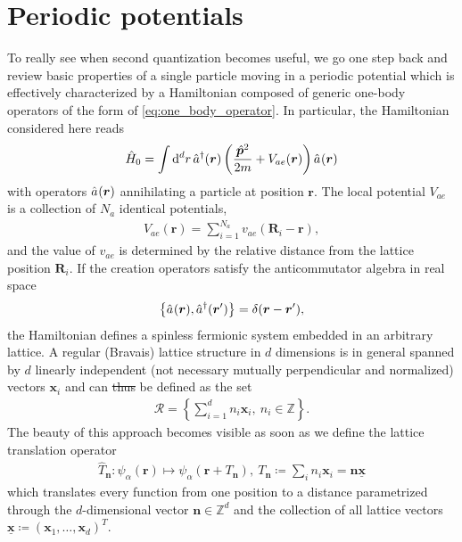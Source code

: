 \documentclass{svmono}
\def\rd{\mathrm d}
\def\pdag{{\vphantom\dag}}
\newcommand{\anticommutator}[1]{\left\{ #1 \right\}}
\newcommand{\brlr}[1]{\left( #1 \right)}
\providecommand{\DIFdeltex}[1]{{\protect\color{red}\sout{#1}}}                      %
\providecommand{\DIFdelbegin}{} %
\providecommand{\DIFdelend}{} %
\providecommand{\DIFdel}[1]{\texorpdfstring{\DIFdeltex{#1}}{}} %
\newcommand{\DIFscaledelfig}{0.5}
\newlength{\DIFdelgraphicswidth} %
\newlength{\DIFdelgraphicsheight} %
\newcommand{\DIFdelincludegraphics}[2][]{%
\sbox{\DIFdelgraphicsbox}{\DIFOincludegraphics[#1]{#2}}%
\settoboxwidth{\DIFdelgraphicswidth}{\DIFdelgraphicsbox} %
\settoboxtotalheight{\DIFdelgraphicsheight}{\DIFdelgraphicsbox} %
\scalebox{\DIFscaledelfig}{%
\parbox[b]{\DIFdelgraphicswidth}{\usebox{\DIFdelgraphicsbox}\\[-\baselineskip] \rule{\DIFdelgraphicswidth}{0em}}\llap{\resizebox{\DIFdelgraphicswidth}{\DIFdelgraphicsheight}{%
\setlength{\unitlength}{\DIFdelgraphicswidth}%
\begin{picture}(1,1)%
\thicklines\linethickness{2pt} %
{\color[rgb]{1,0,0}\put(0,0){\framebox(1,1){}}}%
{\color[rgb]{1,0,0}\put(0,0){\line( 1,1){1}}}%
{\color[rgb]{1,0,0}\put(0,1){\line(1,-1){1}}}%
\end{picture}%
}\hspace*{3pt}}} %
} %
\DeclareRobustCommand{\DIFdelbegin}{\DIFOdelbegin \let\includegraphics\DIFdelincludegraphics} %
\DeclareRobustCommand{\DIFdelend}{\DIFOaddend \let\includegraphics\DIFOincludegraphics} %
\begin{document}
\section{Periodic potentials}
\label{sec:periodic_potentials}
To really see when second quantization becomes useful, we go one step back and review basic properties of a single particle moving in a periodic potential which is effectively characterized by a Hamiltonian composed of generic one-body operators of the form of \cref{eq:one_body_operator}.
In particular, the Hamiltonian considered here reads
\begin{align}
    \hat H_0 = \int\rd^d r\, \hat a^\dag({\bm r})\brlr{\frac{\hat{\bm p}^2}{2m}+V_{ae}({\bm r})}\hat a^\pdag({\bm r})
\end{align}
with operators $\hat a^\pdag({\bm r})$ annihilating a particle at position $\bm r$.
The local potential $V_{ae}$ is a collection of $N_a$ identical potentials,
\begin{align}
    V_{ae}({\bm r}) = \sum_{i=1}^{N_a}v_{ae}({\bm R}_i - {\bm r}),
\end{align}
and the value of $v_{ae}$ is determined by the relative distance from the lattice position ${\bm R}_i$.
If the creation operators satisfy the anticommutator algebra in real space
\begin{align}
    \anticommutator{\hat a^\pdag({\bm r}),\hat a^\dag({\bm r'})}=\delta({\bm r}-{\bm r'}),
\end{align}
the Hamiltonian defines a spinless fermionic system embedded in an arbitrary lattice.
A regular (Bravais) lattice structure in $d$ dimensions is in general spanned by $d$ linearly independent (not necessary mutually perpendicular and normalized) vectors ${\bm x}_i$ and can \DIFdelbegin \DIFdel{thus }\DIFdelend be defined as the set
\begin{align}
    \mathcal{R} = \anticommutator{\sum_{i=1}^d n_i {\bm x}_i,\ n_i\in\mathds Z}.
\end{align}
The beauty of this approach becomes visible as soon as we define the lattice translation operator
\begin{align}
    \hat T_{\bm n} : \psi_\alpha({\bm r}) \mapsto \psi_\alpha\brlr{{\bm r}+T_{\bm n}},\ T_{\bm n}\coloneqq\sum_i n_i {\bm x}_i={\bm n}\underline{\bm x}
\end{align}
which translates every function from one position to a distance parametrized through the $d$-dimensional vector ${\bm n}\in\mathds Z^d$ and the collection of all lattice vectors $\underline{\bm x}\coloneqq ({\bm x}_1,\dots,{\bm x}_d)^T$.
\end{document}
